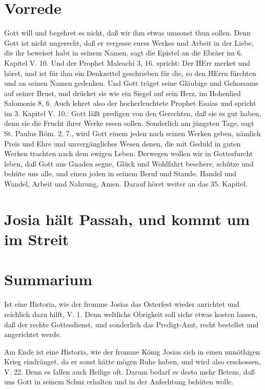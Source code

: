 \section{Vorrede}

Gott will und begehret es nicht, daß wir ihm etwas umsonst thun sollen. Denn Gott ist nicht ungerecht, daß er vergesse eures Werkes und Arbeit in der Liebe, die ihr beweiset habt in seinem Namen, sagt die Epistel an die Ebräer im 6. Kapitel V. 10. Und der Prophet Maleachi 3, 16. spricht: Der HErr merket und höret, und ist für ihm ein Denkzettel geschrieben für die, so den HErrn fürchten und an seinen Namen gedenken. Und Gott träget seine Gläubige und Gehorsame auf seiner Brust, und drücket sie wie ein Siegel auf sein Herz, im Hohenlied Salomonis 8, 6. Auch lehret also der hocherleuchtete Prophet Esaias und spricht im 3. Kapitel V. 10.: Gott läßt predigen von den Gerechten, daß sie es gut haben, denn sie die Frucht ihrer Werke essen sollen. Sonderlich am jüngsten Tage, sagt St. Paulus Röm. 2, 7., wird Gott einem jeden nach seinen Werken geben, nämlich Preis und Ehre und unvergängliches Wesen denen, die mit Geduld in guten Werken trachten nach dem ewigen Leben. Derwegen wollen wir in Gottesfurcht leben, daß Gott aus Gnaden segne, Glück und Wohlfahrt beschere, schütze und behüte uns alle, und einen jeden in seinem Beruf und Stande, Handel und Wandel, Arbeit und Nahrung, Amen. Darauf höret weiter an das 35. Kapitel.

\section[Josia hält Passah, und kommt um im Streit]{Josia hält Passah, und kommt um im Streit}

\section{Summarium}

Ist eine Historia, wie der fromme Josias das Osterfest wieder anrichtet und reichlich dazu hilft, V. 1. Denn weltliche Obrigkeit soll sichs etwas kosten lassen, daß der rechte Gottesdienst, und sonderlich das Predigt-Amt, recht bestellet und angerichtet werde.

Am Ende ist eine Historia, wie der fromme König Josias sich in einen unnöthigen Krieg eindränget, da er sonst hätte mögen Ruhe haben, und wird also erschossen, V. 22. Denn es fallen auch Heilige oft. Darum bedarf es desto mehr Betens, daß uns Gott in seinem Schuz erhalten und in der Anfechtung behüten wolle.

